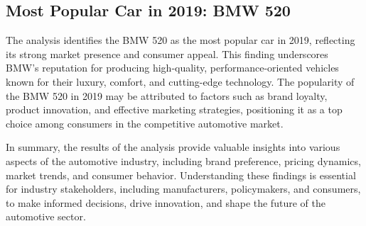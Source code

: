 \documentclass{article}
\begin{document}
{\subsection*{Most Popular Car in 2019: BMW 520}
The analysis identifies the BMW 520 as the most popular car in 2019, reflecting its strong market presence and consumer appeal. This finding underscores BMW's reputation for producing high-quality, performance-oriented vehicles known for their luxury, comfort, and cutting-edge technology. The popularity of the BMW 520 in 2019 may be attributed to factors such as brand loyalty, product innovation, and effective marketing strategies, positioning it as a top choice among consumers in the competitive automotive market.

In summary, the results of the analysis provide valuable insights into various aspects of the automotive industry, including brand preference, pricing dynamics, market trends, and consumer behavior. Understanding these findings is essential for industry stakeholders, including manufacturers, policymakers, and consumers, to make informed decisions, drive innovation, and shape the future of the automotive sector.

}


\newpage
\end{document}

